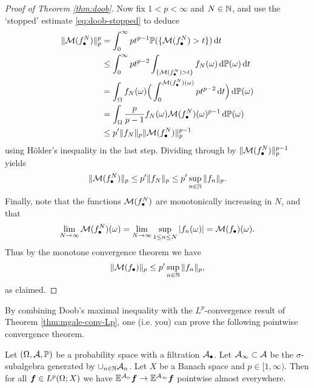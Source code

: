 \begin{proof}[Proof of Theorem \ref{thm:doob}]
  Now fix $1 < p < \infty$ and $N \in \mathbb{N}$, and use the `stopped' estimate \eqref{eq:doob-stopped} to deduce
  \begin{equation*}
    \begin{aligned}
      \|\mathcal{M}(f_{\bullet}^{N})\|_{p}^{p}
      &= \int_0^\infty pt^{p-1} \mathbb{P}(\{\mathcal{M}(f_{\bullet}^{N}) > t\}) \, \mathrm{d} t \\
      &\leq \int_0^\infty pt^{p-2} \int_{\{\mathcal{M}(f_{\bullet}^{N}) > t\}} f_{N}(\omega) \, \mathrm{d}\mathbb{P}(\omega) \, \mathrm{d} t \\
      &=  \int_{\Omega} f_{N}(\omega) \Big( \int_0^{\mathcal{M}(f_{\bullet}^{N})(\omega)} pt^{p-2} \, \mathrm{d} t \Big) \, \mathrm{d}\mathbb{P}(\omega) \\
      &=  \int_{\Omega} \frac{p}{p-1} f_{N}(\omega) \mathcal{M}(f_{\bullet}^{N})(\omega)^{p-1} \, \mathrm{d}\mathbb{P}(\omega) \\
      &\leq  p' \|f_{N}\|_{p} \|\mathcal{M}(f_\bullet^{N})\|_{p}^{p-1}
    \end{aligned}
  \end{equation*}
  using H\"older's inequality in the last step.
  Dividing through by $\|\mathcal{M}(f_{\bullet}^{N})\|_{p}^{p-1}$ yields
  \begin{equation*}
    \|\mathcal{M}(f_{\bullet}^{N})\|_{p} \leq p' \|f_{N}\|_{p} \leq p' \sup_{n \in \mathbb{N}} \|f_{n}\|_{p}.
  \end{equation*}
  Finally, note that the functions $\mathcal{M}(f_{\bullet}^{N})$ are monotonically increasing in $N$, and that
  \begin{equation*}
    \lim_{N \to \infty} \mathcal{M}(f_{\bullet}^{N})(\omega) = \lim_{N \to \infty} \sup_{1 \leq n \leq N} |f_{n}(\omega)| = \mathcal{M}(f_{\bullet})(\omega).
  \end{equation*}
  Thus by the monotone convergence theorem we have
  \begin{equation*}
    \|\mathcal{M}(f_{\bullet})\|_{p} \leq p' \sup_{n \in \mathbb{N}} \|f_{n}\|_{p},
  \end{equation*}
  as claimed.
\end{proof}

By combining Doob's maximal inequality with the $L^p$-convergence result of Theorem \ref{thm:mgale-conv-Lp}, one (i.e. you) can prove the following pointwise convergence theorem.

\begin{thm}\label{thm:mgale-pw-conv}
  Let $(\Omega, \mathcal{A}, \mathbb{P})$ be a probability space with a filtration $\mathcal{A}_{\bullet}$.
  Let $\mathcal{A}_{\infty} \subset \mathcal{A}$ be the $\sigma$-subalgebra generated by $\cup_{n \in \mathbb{N}} \mathcal{A}_{n}$.
  Let $X$ be a Banach space and $p \in [1,\infty)$.
  Then for all $\bm{f} \in L^p(\Omega;X)$ we have $\mathbb{E}^{\mathcal{A}_{n}} \bm{f} \to \mathbb{E}^{\mathcal{A}_\infty} \bm{f}$ pointwise almost everywhere.
\end{thm}


